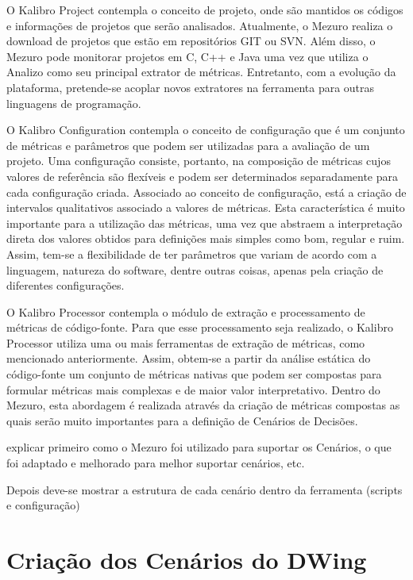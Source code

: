 O Kalibro Project contempla o conceito de projeto, onde são mantidos os códigos e informações de projetos que serão analisados. Atualmente, o Mezuro realiza o download de projetos que estão em repositórios GIT ou SVN. Além disso, o Mezuro pode monitorar projetos em C, C++ e Java uma vez que utiliza o Analizo como seu principal extrator de métricas. Entretanto, com a evolução da plataforma, pretende-se acoplar novos extratores na ferramenta para outras linguagens de programação.

O Kalibro Configuration contempla o conceito de configuração que é um conjunto de métricas e parâmetros que podem ser utilizadas para a avaliação de um projeto. Uma configuração consiste, portanto, na composição de métricas cujos valores de referência são flexíveis e podem ser determinados separadamente para cada configuração criada. Associado ao conceito de configuração, está a criação de intervalos qualitativos associado a valores de métricas. Esta característica é muito importante para a utilização das métricas, uma vez que abstraem a interpretação direta dos valores obtidos para definições mais simples como bom, regular e ruim. Assim, tem-se a flexibilidade de ter parâmetros que variam de acordo com a linguagem, natureza do software, dentre outras coisas, apenas pela criação de diferentes configurações.

O Kalibro Processor contempla o módulo de extração e processamento de métricas de código-fonte. Para que esse processamento seja realizado, o Kalibro Processor utiliza uma ou mais ferramentas de extração de métricas, como mencionado anteriormente. Assim, obtem-se a partir da análise estática do código-fonte um conjunto de métricas nativas que podem ser compostas para formular métricas mais complexas e de maior valor interpretativo. Dentro do Mezuro, esta abordagem é realizada através da criação de métricas compostas as quais serão muito importantes para a definição de Cenários de Decisões.


explicar primeiro como o Mezuro foi utilizado para suportar os Cenários, o que foi adaptado e melhorado para melhor suportar cenários, etc.

Depois deve-se mostrar a estrutura de cada cenário dentro da ferramenta (scripts e configuração)

\section{Criação dos Cenários do DWing}
\label{dw-cenarios}

